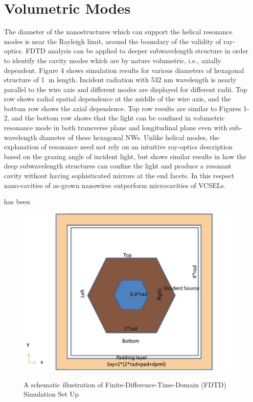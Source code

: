 \section{Volumetric Modes} \label{sed} The diameter of the nanostructures which
can support the helical resonance modes is near the Rayleigh limit, around the
boundary of the validity of ray-optics. FDTD analysis can be applied to deeper
subwavelength structure in order to identify the cavity modes which are by
nature volumetric, i.e., axially dependent.  Figure 4 shows simulation results
for various diameters of hexagonal structure of 1 m length.  Incident
radiation with 532 nm wavelength is nearly parallel to the wire axis and
different modes are displayed for different radii. Top row shows radial spatial
dependence at the middle of the wire axis, and the bottom row shows the axial
dependence. Top row results are similar to Figures 1-2, and the bottom row
shows that the light can be confined in volumetric resonance mode in both
transverse plane and longitudinal plane even with sub-wavelength diameter of
these hexagonal NWs. Unlike helical modes, the explanation of resonance  need
not rely on an intuitive ray-optics description based on the grazing angle of
incident light, but shows similar results in how the deep subwavelength
structures can confine the light and produce a resonant cavity without having
sophisticated mirrors at the end facets. In this respect nano-cavities of
as-grown nanowires outperform microcavities of VCSELs.  

has been~\cite{Oskooi:2010fb} 

\begin{figure}
  \caption{A schematic illustration of Finite-Difference-Time-Domain (FDTD) Simulation Set Up}
  \centering
  \includegraphics[width=\textwidth]{pictures/LM/MeepSchematic}
  \label{MeepSchematic}
\end{figure}

